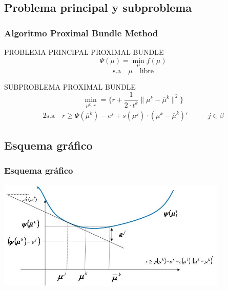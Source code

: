 \documentclass[xcolor=dvipsnames, utf8, spanish]{beamer} %
\begin{document}
\subsection{Problema principal y subproblema}

\begin{frame}
	\frametitle{Algoritmo Proximal Bundle Method}
	\begingroup %
		\begin{block} {PROBLEMA PRINCIPAL PROXIMAL BUNDLE}
			\begin{equation}
				\Psi(\mu)=\min_\mu f(\mu)
			\end{equation}
			\begin{displaymath}
				\text{s.a} \quad \mu \quad  \text{libre}
			\end{displaymath}
		\end{block}
	\endgroup
	\begingroup
		\begin{block} {SUBPROBLEMA PROXIMAL BUNDLE}
			\begin{equation}
				\min_{\mu^k,r}=\Big\{r+\frac{1}{2\cdot t^k }\lVert \mu^k- \overline{\mu}^k \lVert^2 \Big\} 	\label{eq:subpr} 
			\end{equation}
			\begin{alignat}{2}
				\text{s.a} \quad r\geq \Psi(\overline{\mu}^k)-e^j+s(\mu^j) \cdot (\mu^k- \overline{\mu}^k)' 		&\qquad j \in \beta \nonumber
			\end{alignat}
		\end{block}
	\endgroup
\end{frame}

\subsection{Esquema gráfico}

\begin{frame}
	\frametitle{Esquema gráfico}
	\begin{center}
		\includegraphics[width=11cm]{figuras/esquemaPBM.JPG}
	\end{center}
\end{frame}
\end{document}
